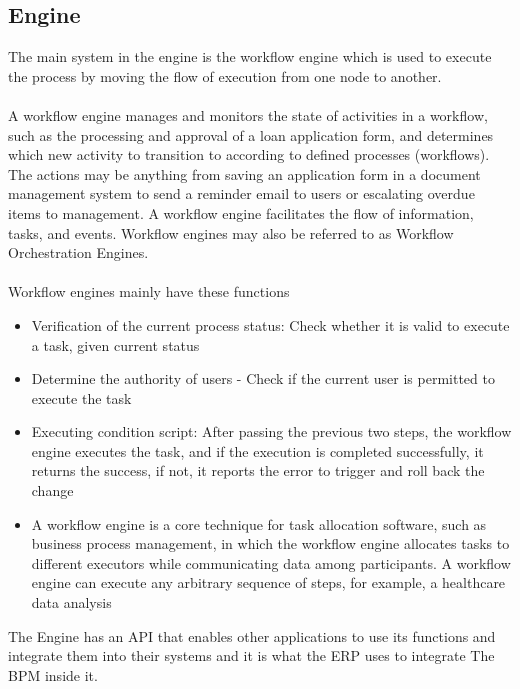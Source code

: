 \subsection{Engine}

The main system in the engine is the workflow engine which is used to execute the process by moving
the flow of execution from one node to another.\\\\
A workflow engine manages and monitors the state of activities in a workflow, such as the processing
and approval of a loan application form, and determines which new activity to transition to according
to defined processes (workflows). The actions may be anything from saving an application form in a
document management system to send a reminder email to users or escalating overdue items to
management. A workflow engine facilitates the flow of information, tasks, and events. Workflow
engines may also be referred to as Workflow Orchestration Engines.\\\\
Workflow engines mainly have these functions

\begin{itemize}
    \item Verification of the current process status: Check whether it is valid to execute a task, given
    current status
    \item Determine the authority of users - Check if the current user is permitted to execute the task
    \item Executing condition script: After passing the previous two steps, the workflow engine
    executes the task, and if the execution is completed successfully, it returns the success, if not,
    it reports the error to trigger and roll back the change
    \item A workflow engine is a core technique for task allocation software, such as business process
    management, in which the workflow engine allocates tasks to different executors while
    communicating data among participants. A workflow engine can execute any arbitrary
    sequence of steps, for example, a healthcare data analysis
\end{itemize}

The Engine has an API that enables other applications to use its functions and integrate them into their
systems and it is what the ERP uses to integrate The BPM inside it.\\\\

